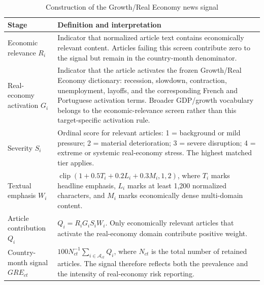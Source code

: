 \begin{table}[htbp]
\centering\small
\caption{Construction of the Growth/Real Economy news signal}
\label{tab:construction}
\begin{tabularx}{\textwidth}{p{}X}
\toprule
Stage & Definition and interpretation \\
\midrule
Economic relevance $R_i$ & Indicator that normalized article text contains economically relevant content. Articles failing this screen contribute zero to the signal but remain in the country-month denominator. \\
Real-economy activation $G_i$ & Indicator that the article activates the frozen Growth/Real Economy dictionary: recession, slowdown, contraction, unemployment, layoffs, and the corresponding French and Portuguese activation terms. Broader GDP/growth vocabulary belongs to the economic-relevance screen rather than this target-specific activation rule. \\
Severity $S_i$ & Ordinal score for relevant articles: 1 = background or mild pressure; 2 = material deterioration; 3 = severe disruption; 4 = extreme or systemic real-economy stress. The highest matched tier applies. \\
Textual emphasis $W_i$ & $\operatorname{clip}(1+0.5T_i+0.2L_i+0.3M_i,1,2)$, where $T_i$ marks headline emphasis, $L_i$ marks at least 1,200 normalized characters, and $M_i$ marks economically dense multi-domain content. \\
Article contribution $Q_i$ & $Q_i=R_iG_iS_iW_i$. Only economically relevant articles that activate the real-economy domain contribute positive weight. \\
Country-month signal $GRE_{ct}$ & $100N_{ct}^{-1}\sum_{i\in\mathcal A_{ct}}Q_i$, where $N_{ct}$ is the total number of retained articles. The signal therefore reflects both the prevalence and the intensity of real-economy risk reporting. \\
\bottomrule
\end{tabularx}
\end{table}

